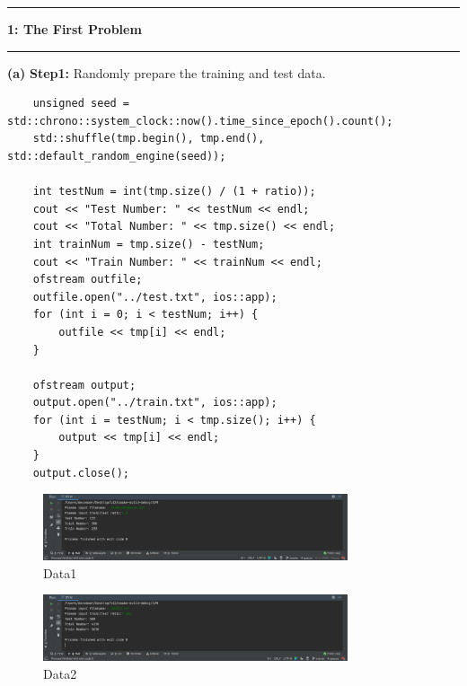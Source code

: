 \documentclass[11pt]{article}
\newcommand\question[2]{\vspace{.25in}\hrule\textbf{#1: #2}\vspace{.5em}\hrule\vspace{.10in}}
\renewcommand\part[1]{\vspace{.10in}\textbf{(#1)}}
\newcommand\one{\vspace{.10in}\textbf{Step1: }}
\begin{document}
\raggedright
\newcommand\NAME{Yao Xiao}  %
\newcommand\ANDREWID{2019180015}     %
\newcommand\HWNUM{2}              %

\question{1}{The First Problem}
\part{a} \one Randomly prepare the training and test data.\\

\begin{lstlisting}
    unsigned seed = std::chrono::system_clock::now().time_since_epoch().count();
    std::shuffle(tmp.begin(), tmp.end(), std::default_random_engine(seed));

    int testNum = int(tmp.size() / (1 + ratio));
    cout << "Test Number: " << testNum << endl;
    cout << "Total Number: " << tmp.size() << endl;
    int trainNum = tmp.size() - testNum;
    cout << "Train Number: " << trainNum << endl;
    ofstream outfile;
    outfile.open("../test.txt", ios::app);
    for (int i = 0; i < testNum; i++) {
        outfile << tmp[i] << endl;
    }

    ofstream output;
    output.open("../train.txt", ios::app);
    for (int i = testNum; i < tmp.size(); i++) {
        output << tmp[i] << endl;
    }
    output.close();
\end{lstlisting}

\begin{figure}[H]
    \centering
    \includegraphics[width=0.8\textwidth]{gd1}
    \caption{Data1}
\end{figure}

\begin{figure}[H]
    \centering
    \includegraphics[width=0.8\textwidth]{gd2}
    \caption{Data2}
\end{figure}
\end{document}
